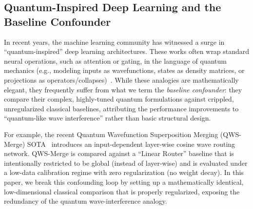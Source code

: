 \subsection{Quantum-Inspired Deep Learning and the Baseline Confounder}
In recent years, the machine learning community has witnessed a surge in ``quantum-inspired'' deep learning architectures. These works often wrap standard neural operations, such as attention or gating, in the language of quantum mechanics (e.g., modeling inputs as wavefunctions, states as density matrices, or projections as operators/collapses)~\cite{qwsmerge}. While these analogies are mathematically elegant, they frequently suffer from what we term the \textit{baseline confounder}: they compare their complex, highly-tuned quantum formulations against crippled, unregularized classical baselines, attributing the performance improvements to ``quantum-like wave interference'' rather than basic structural design. 

For example, the recent Quantum Wavefunction Superposition Merging (QWS-Merge) SOTA~\cite{qwsmerge} introduces an input-dependent layer-wise cosine wave routing network. QWS-Merge is compared against a ``Linear Router'' baseline that is intentionally restricted to be global (instead of layer-wise) and is evaluated under a low-data calibration regime with zero regularization (no weight decay). In this paper, we break this confounding loop by setting up a mathematically identical, low-dimensional classical comparison that is properly regularized, exposing the redundancy of the quantum wave-interference analogy.
